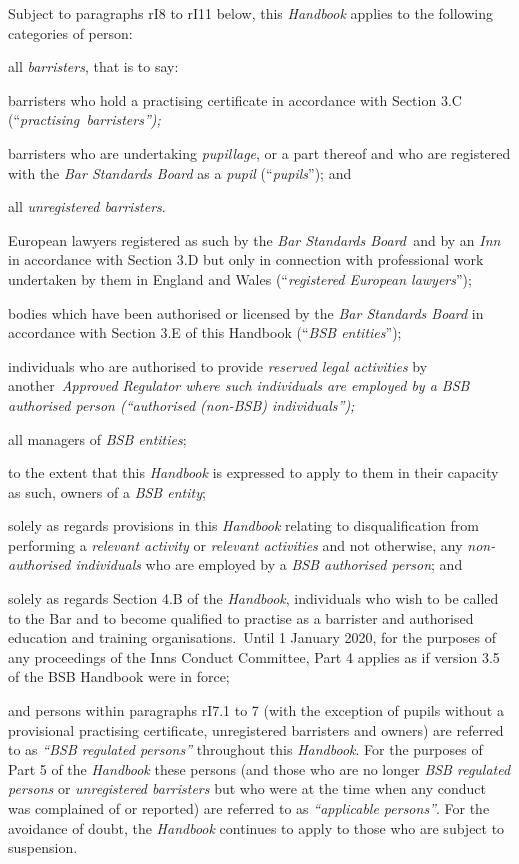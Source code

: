 Subject to paragraphs rI8 to rI11 below, this \emph{Handbook} applies to
the following categories of person:
\begin{numlist}\item all \emph{barristers}, that is to say:
\begin{alphlist}
\item barristers who hold a practising certificate in accordance with
Section 3.C (``\emph{practising~\emph{barristers}'');}

\item barristers who are undertaking \emph{pupillage}, or a part thereof
and who are registered with the \emph{Bar Standards Board} as a
\emph{pupil} (``\emph{pupils}''); and

\item all \emph{unregistered barristers}.
\item European lawyers registered as such by the \emph{Bar Standards
Board~}and by an \emph{Inn} in accordance with Section 3.D but only in
connection with professional work undertaken by them in England and
Wales (``\emph{registered European lawyers}'');\end{alphlist}
\item bodies which have been authorised or licensed by the \emph{Bar
Standards Board} in accordance with Section 3.E of this Handbook
(``\emph{BSB entities}'');
\item individuals who are authorised to provide \emph{reserved legal
activities} by another~\emph{Approved Regulator where such individuals
are employed by a \emph{BSB authorised person} (``\emph{authorised
(non-BSB)} \emph{individuals}'');}
\item all managers of \emph{BSB entities};
\item to the extent that this \emph{Handbook} is expressed to apply to them
in their capacity as such, owners of a \emph{BSB entity};
\item solely as regards provisions in this \emph{Handbook} relating to
disqualification from performing a \emph{relevant activity} or
\emph{relevant activities} and not otherwise, any \emph{non-authorised
individuals} who are employed by a \emph{BSB authorised person}; and
\item solely as regards Section 4.B of the \emph{Handbook}, individuals who
wish to be called to the Bar and to become qualified to practise as a
barrister and authorised education and training organisations.~Until 1
January 2020, for the purposes of any proceedings of the Inns Conduct
Committee, Part 4 applies as if version 3.5 of the BSB Handbook were in
force;
\item and persons within paragraphs rI7.1 to 7 (with the exception of
pupils without a provisional practising certificate, unregistered
barristers and owners) are referred to as \emph{``BSB regulated
persons''} throughout this \emph{Handbook}. For the purposes of Part 5
of the \emph{Handbook} these persons (and those who are no longer
\emph{BSB regulated persons} or \emph{unregistered barristers} but who
were at the time when any conduct was complained of or reported) are
referred to as \emph{``applicable persons''}. For the avoidance of
doubt, the \emph{Handbook} continues to apply to those who are subject
to suspension.
\end{numlist}
